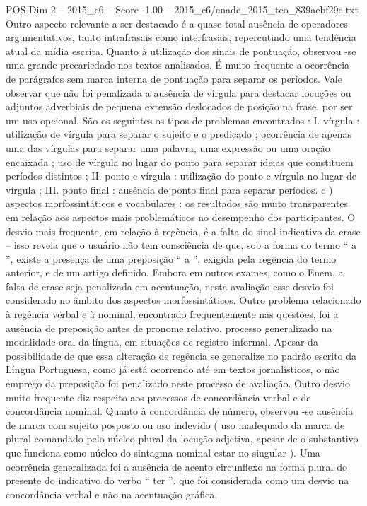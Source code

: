 \begin{textsample}{POS Dim 2 – 2015\_c6 – Score -1.00 – 2015\_c6/enade\_2015\_teo\_839aebf29e.txt}
Outro aspecto relevante a ser destacado é a quase total ausência de operadores argumentativos, tanto intrafrasais como interfrasais, repercutindo uma tendência atual da mídia escrita.
Quanto à utilização dos sinais de pontuação, observou -se uma grande precariedade nos textos analisados.
É muito frequente a ocorrência de parágrafos sem marca interna de pontuação para separar os períodos.
Vale observar que não foi penalizada a ausência de vírgula para destacar locuções ou adjuntos adverbiais de pequena extensão deslocados de posição na frase, por ser um uso opcional.
São os seguintes os tipos de problemas encontrados : I. vírgula : utilização de vírgula para separar o sujeito e o predicado ; ocorrência de apenas uma das vírgulas para separar uma palavra, uma expressão ou uma oração encaixada ; uso de vírgula no lugar do ponto para separar ideias que constituem períodos distintos ; II. ponto e vírgula : utilização do ponto e vírgula no lugar de vírgula ; III. ponto final : ausência de ponto final para separar períodos. c ) aspectos morfossintáticos e vocabulares : os resultados são muito transparentes em relação aos aspectos mais problemáticos no desempenho dos participantes.
O desvio mais frequente, em relação à regência, é a falta do sinal indicativo da crase – isso revela que o usuário não tem consciência de que, sob a forma do termo “ a ”, existe a presença de uma preposição “ a ”, exigida pela regência do termo anterior, e de um artigo definido.
Embora em outros exames, como o Enem, a falta de crase seja penalizada em acentuação, nesta avaliação esse desvio foi considerado no âmbito dos aspectos morfossintáticos.
Outro problema relacionado à regência verbal e à nominal, encontrado frequentemente nas questões, foi a ausência de preposição antes de pronome relativo, processo generalizado na modalidade oral da língua, em situações de registro informal.
Apesar da possibilidade de que essa alteração de regência se generalize no padrão escrito da Língua Portuguesa, como já está ocorrendo até em textos jornalísticos, o não emprego da preposição foi penalizado neste processo de avaliação.
Outro desvio muito frequente diz respeito aos processos de concordância verbal e de concordância nominal.
Quanto à concordância de número, observou -se ausência de marca com sujeito posposto ou uso indevido ( uso inadequado da marca de plural comandado pelo núcleo plural da locução adjetiva, apesar de o substantivo que funciona como núcleo do sintagma nominal estar no singular ).
Uma ocorrência generalizada foi a ausência de acento circunflexo na forma plural do presente do indicativo do verbo “ ter ”, que foi considerada como um desvio na concordância verbal e não na acentuação gráfica.

\end{textsample}
